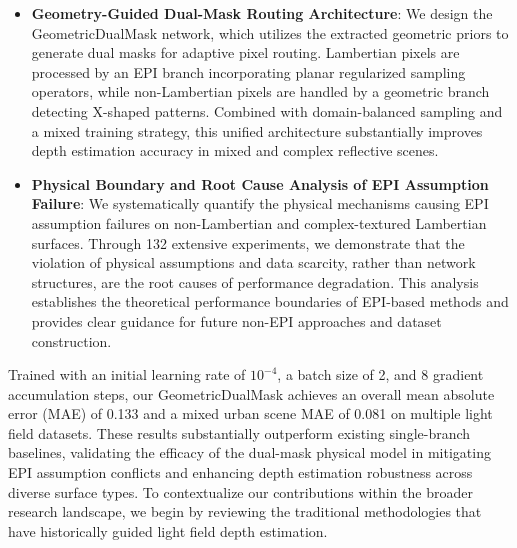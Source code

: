 \begin{itemize}\item \textbf{Geometry-Guided Dual-Mask Routing Architecture}: We design the GeometricDualMask network, which utilizes the extracted geometric priors to generate dual masks for adaptive pixel routing. Lambertian pixels are processed by an EPI branch incorporating planar regularized sampling operators, while non-Lambertian pixels are handled by a geometric branch detecting X-shaped patterns. Combined with domain-balanced sampling and a mixed training strategy, this unified architecture substantially improves depth estimation accuracy in mixed and complex reflective scenes.\end{itemize}

\begin{itemize}\item \textbf{Physical Boundary and Root Cause Analysis of EPI Assumption Failure}: We systematically quantify the physical mechanisms causing EPI assumption failures on non-Lambertian and complex-textured Lambertian surfaces. Through 132 extensive experiments, we demonstrate that the violation of physical assumptions and data scarcity, rather than network structures, are the root causes of performance degradation. This analysis establishes the theoretical performance boundaries of EPI-based methods and provides clear guidance for future non-EPI approaches and dataset construction.\end{itemize}

Trained with an initial learning rate of $10^{-4}$, a batch size of 2, and 8 gradient accumulation steps, our GeometricDualMask achieves an overall mean absolute error (MAE) of 0.133 and a mixed urban scene MAE of 0.081 on multiple light field datasets. These results substantially outperform existing single-branch baselines, validating the efficacy of the dual-mask physical model in mitigating EPI assumption conflicts and enhancing depth estimation robustness across diverse surface types. To contextualize our contributions within the broader research landscape, we begin by reviewing the traditional methodologies that have historically guided light field depth estimation.